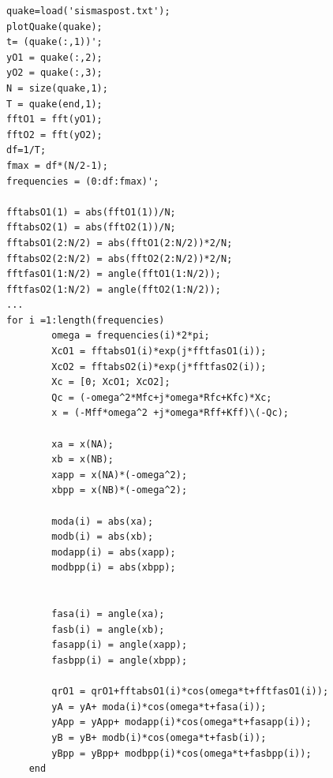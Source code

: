 \documentclass[10pt,a4paper,final]{report}
\begin{document}
\begin{lstlisting}
quake=load('sismaspost.txt');
plotQuake(quake);
t= (quake(:,1))';
yO1 = quake(:,2);
yO2 = quake(:,3);
N = size(quake,1);
T = quake(end,1);
fftO1 = fft(yO1);
fftO2 = fft(yO2);
df=1/T;
fmax = df*(N/2-1);
frequencies = (0:df:fmax)';

fftabsO1(1) = abs(fftO1(1))/N;
fftabsO2(1) = abs(fftO2(1))/N;
fftabsO1(2:N/2) = abs(fftO1(2:N/2))*2/N;
fftabsO2(2:N/2) = abs(fftO2(2:N/2))*2/N;
fftfasO1(1:N/2) = angle(fftO1(1:N/2));
fftfasO2(1:N/2) = angle(fftO2(1:N/2));
...    
for i =1:length(frequencies)
        omega = frequencies(i)*2*pi;
        XcO1 = fftabsO1(i)*exp(j*fftfasO1(i));
        XcO2 = fftabsO2(i)*exp(j*fftfasO2(i));
        Xc = [0; XcO1; XcO2];
        Qc = (-omega^2*Mfc+j*omega*Rfc+Kfc)*Xc;
        x = (-Mff*omega^2 +j*omega*Rff+Kff)\(-Qc);

        xa = x(NA);
        xb = x(NB);
        xapp = x(NA)*(-omega^2);
        xbpp = x(NB)*(-omega^2);

        moda(i) = abs(xa);
        modb(i) = abs(xb);
        modapp(i) = abs(xapp);
        modbpp(i) = abs(xbpp);


        fasa(i) = angle(xa);
        fasb(i) = angle(xb);
        fasapp(i) = angle(xapp);
        fasbpp(i) = angle(xbpp);

        qrO1 = qrO1+fftabsO1(i)*cos(omega*t+fftfasO1(i));
        yA = yA+ moda(i)*cos(omega*t+fasa(i));
        yApp = yApp+ modapp(i)*cos(omega*t+fasapp(i));
        yB = yB+ modb(i)*cos(omega*t+fasb(i));
        yBpp = yBpp+ modbpp(i)*cos(omega*t+fasbpp(i));
    end
\end{lstlisting}

\newpage
\end{document}
